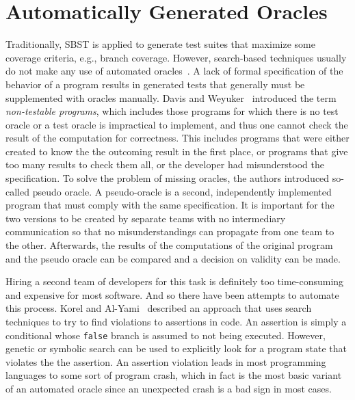 \documentclass[paper=a4,%
  twoside,%
  BCOR4mm,%
  abstract=true,%
  toc=bibliography,%
  chapterprefix=true,%
  toc=bibliographynumbered,%
  open=right,%
  english,%
  pagesize=pdftex]{scrreprt}
\begin{document}
\section{Automatically Generated Oracles}
\label{sec:generated-oracles}
Traditionally, \ac{SBST} is applied to generate test suites that maximize some coverage criteria, e.g., branch coverage. However, search-based techniques usually do not make any use of automated oracles~\cite{Fraser2013}. A lack of formal specification of the behavior of a program results in generated tests that generally must be supplemented with oracles manually. Davis and Weyuker~\cite{10.1145/800175.809889} introduced the term \textit{non-testable programs}, which includes those programs for which there is no test oracle or a test oracle is impractical to implement, and thus one cannot check the result of the computation for correctness. This includes programs that were either created to know the the outcoming result in the first place, or programs that give too many results to check them all, or the developer had misunderstood the specification. To solve the problem of missing oracles, the authors introduced so-called pseudo oracle. A pseudo-oracle is a second, independently implemented program that must comply with the same specification. It is important for the two versions to be created by separate teams with no intermediary communication so that no misunderstandings can propagate from one team to the other. Afterwards, the results of the computations of the original program and the pseudo oracle can be compared and a decision on validity can be made.

Hiring a second team of developers for this task is definitely too time-consuming and expensive for most software. And so there have been attempts to automate this process. Korel and Al-Yami~\cite{Korel1996} described an approach that uses search techniques to try to find violations to assertions in code. An assertion is simply a conditional whose \lstinline{false} branch is assumed to not being executed. However, genetic or symbolic search can be used to explicitly look for a program state that violates the the assertion. An assertion violation leads in most programming languages to some sort of program crash, which in fact is the most basic variant of an automated oracle since an unexpected crash is a bad sign in most cases. 
\end{document}
